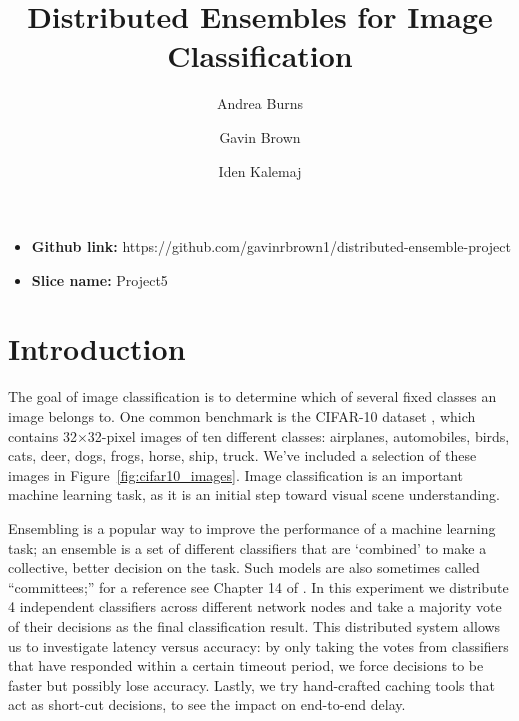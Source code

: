 \documentclass[11pt]{article}
\title{\vspace{-5ex} Distributed Ensembles for Image Classification}
\author{Andrea Burns \and Gavin Brown \and Iden Kalemaj}
\date{\vspace{-5ex}}
\begin{document}
\maketitle
\begin{itemize}
	\item \textbf{Github link:} https://github.com/gavinrbrown1/distributed-ensemble-project
	\item \textbf{Slice name:} Project5
\end{itemize}
\vspace{-2ex}
\section{Introduction}

The goal of image classification is to determine which of several fixed classes an image belongs to. 
One common benchmark is the CIFAR-10 dataset \cite{cifar10}, which contains 32$\times$32-pixel images of ten different classes: airplanes, automobiles, birds, cats, deer, dogs, frogs, horse, ship, truck.
We've included a selection of these images in Figure~\ref{fig:cifar10_images}.
Image classification is an important machine learning task, as it is an initial step toward visual scene understanding. 

Ensembling is a popular way to improve the performance of a machine learning task; an ensemble is a set of different classifiers that are ‘combined’ to make a collective, better decision on the task. 
Such models are also sometimes called ``committees;'' for a reference see Chapter 14 of \cite{bishop}.
In this experiment we distribute 4 independent classifiers across different network nodes and take a majority vote of their decisions as the final classification result.
This distributed system allows us to investigate latency versus accuracy: by only taking the votes from classifiers that have responded within a certain timeout period, we force decisions to be faster but possibly lose accuracy.
Lastly, we try hand-crafted caching tools that act as short-cut decisions, to see the impact on end-to-end delay.
\end{document}
